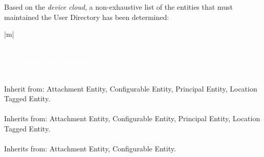  Based on the \emph{device cloud}, a non-exhaustive list of the entities that must maintained the User Directory has been determined:
 
  \def\arraystretch{1.5}
  \begin{longtable}{|m{\textwidth}|}
  	\caption{User Directory Entities} 
  	\label{tab:02_entities}
  	\\
  	\hline
  	\textcolor{white}{\textbf{  User Directory Entities}}
  	\\ \hline
  	
  	 \\
  	 Inherit from: Attachment Entity, Configurable Entity, Principal Entity, Location Tagged Entity.
  	\\ \hline
  	\\
  	Inherits from: Attachment Entity, Configurable Entity, Principal Entity, Location Tagged Entity.
  	\\	\hline
  	\\
  	Inherits from: Attachment Entity, Configurable Entity.
  	\\ 	\hline
  	\\
  	

\end{longtable}
